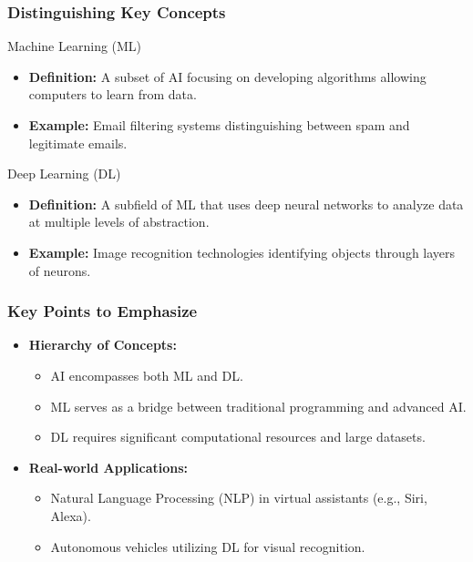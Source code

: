 \documentclass[aspectratio=169]{beamer}
\begin{document}
\begin{frame}[fragile]
    \frametitle{Distinguishing Key Concepts}

    \begin{block}{Machine Learning (ML)}
        \begin{itemize}
            \item \textbf{Definition:} A subset of AI focusing on developing algorithms allowing computers to learn from data.
            \item \textbf{Example:} Email filtering systems distinguishing between spam and legitimate emails.
        \end{itemize}
    \end{block}

    \begin{block}{Deep Learning (DL)}
        \begin{itemize}
            \item \textbf{Definition:} A subfield of ML that uses deep neural networks to analyze data at multiple levels of abstraction.
            \item \textbf{Example:} Image recognition technologies identifying objects through layers of neurons.
        \end{itemize}
    \end{block}
\end{frame}

\begin{frame}[fragile]
    \frametitle{Key Points to Emphasize}

    \begin{itemize}
        \item \textbf{Hierarchy of Concepts:}
        \begin{itemize}
            \item AI encompasses both ML and DL.
            \item ML serves as a bridge between traditional programming and advanced AI.
            \item DL requires significant computational resources and large datasets.
        \end{itemize}

        \item \textbf{Real-world Applications:}
        \begin{itemize}
            \item Natural Language Processing (NLP) in virtual assistants (e.g., Siri, Alexa).
            \item Autonomous vehicles utilizing DL for visual recognition.
        \end{itemize}
    \end{itemize}
\end{frame}
\end{document}
